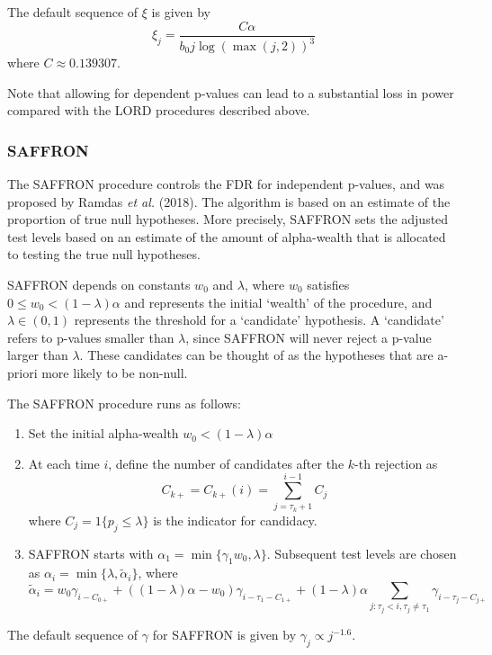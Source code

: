 \documentclass[
]{article}
\begin{document}
The default sequence of \(\xi\) is given by
\[ \xi_j  = \frac{C \alpha }{b_0 j \log(\max(j, 2))^3}\] where
\(C \approx 0.139307\).

Note that allowing for dependent p-values can lead to a substantial loss
in power compared with the LORD procedures described above.

\hypertarget{SAFFRON}{%
\subsubsection{SAFFRON}\label{SAFFRON}}

The SAFFRON procedure controls the FDR for independent p-values, and was
proposed by Ramdas \emph{et al.} (2018). The algorithm is based on an
estimate of the proportion of true null hypotheses. More precisely,
SAFFRON sets the adjusted test levels based on an estimate of the amount
of alpha-wealth that is allocated to testing the true null hypotheses.

SAFFRON depends on constants \(w_0\) and \(\lambda\), where \(w_0\)
satisfies \(0 \leq w_0 < (1 - \lambda)\alpha\) and represents the
initial `wealth' of the procedure, and \(\lambda \in (0,1)\) represents
the threshold for a `candidate' hypothesis. A `candidate' refers to
p-values smaller than \(\lambda\), since SAFFRON will never reject a
p-value larger than \(\lambda\). These candidates can be thought of as
the hypotheses that are a-priori more likely to be non-null.

The SAFFRON procedure runs as follows:

\begin{enumerate}
\def\labelenumi{\arabic{enumi}.}
\item
  Set the initial alpha-wealth \(w_0 < (1-\lambda)\alpha\)
\item
  At each time \(i\), define the number of candidates after the \(k\)-th
  rejection as \[ C_{k+} = C_{k+}(i) = \sum_{j = \tau_k + 1}^{i-1} C_j\]
  where \(C_j = 1\{p_j \leq \lambda \}\) is the indicator for candidacy.
\item
  SAFFRON starts with \(\alpha_1 = \min\{\gamma_1 w_0, \lambda\}\).
  Subsequent test levels are chosen as
  \(\alpha_i = \min\{ \lambda, \tilde{\alpha}_i\}\), where \[
  \tilde{\alpha}_i = w_0 \gamma_{i-C_{0+}} + 
  ((1-\lambda)\alpha - w_0)\gamma_{i-\tau_1-C_{1+}} +
  (1-\lambda)\alpha \sum_{j : \tau_j < i, \tau_j \neq \tau_1} 
  \gamma_{i - \tau_j- C_{j+}}
  \]
\end{enumerate}

The default sequence of \(\gamma\) for SAFFRON is given by
\(\gamma_j \propto j^{-1.6}\).
\end{document}
